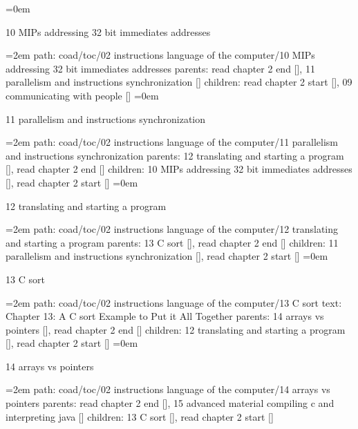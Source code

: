 \leftskip=0em
\par\endgroup
\bigskip
{}
10 MIPs addressing 32 bit immediates addresses
\smallskip
\par\begingroup
\leftskip=2em
path: coad/toc/02 instructions language of the computer/10 MIPs addressing 32 bit immediates addresses
\smallskip
parents:  read chapter 2 end [], 11 parallelism and instructions synchronization []
\smallskip
children: read chapter 2 start [], 09 communicating with people []
\smallskip
\leftskip=0em
\par\endgroup
\bigskip
{}
11 parallelism and instructions synchronization
\smallskip
\par\begingroup
\leftskip=2em
path: coad/toc/02 instructions language of the computer/11 parallelism and instructions synchronization
\smallskip
parents:  12 translating and starting a program [], read chapter 2 end []
\smallskip
children: 10 MIPs addressing 32 bit immediates addresses [], read chapter 2 start []
\smallskip
\leftskip=0em
\par\endgroup
\bigskip
{}
12 translating and starting a program
\smallskip
\par\begingroup
\leftskip=2em
path: coad/toc/02 instructions language of the computer/12 translating and starting a program
\smallskip
parents:  13 C sort [], read chapter 2 end []
\smallskip
children: 11 parallelism and instructions synchronization [], read chapter 2 start []
\smallskip
\leftskip=0em
\par\endgroup
\bigskip
{}
13 C sort
\smallskip
\par\begingroup
\leftskip=2em
path: coad/toc/02 instructions language of the computer/13 C sort
\smallskip
text:  Chapter 13: A C sort Example to Put it All Together
\smallskip
parents:  14 arrays vs pointers [], read chapter 2 end []
\smallskip
children: 12 translating and starting a program [], read chapter 2 start []
\smallskip
\leftskip=0em
\par\endgroup
\bigskip
{}
14 arrays vs pointers
\smallskip
\par\begingroup
\leftskip=2em
path: coad/toc/02 instructions language of the computer/14 arrays vs pointers
\smallskip
parents:  read chapter 2 end [], 15 advanced material compiling c and interpreting java []
\smallskip
children: 13 C sort [], read chapter 2 start []
